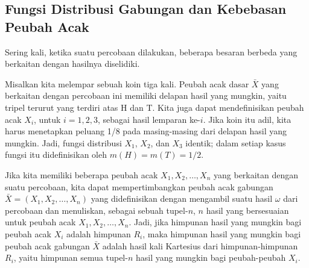 \subsection*{Fungsi Distribusi Gabungan dan Kebebasan Peubah Acak}

Sering kali, ketika suatu percobaan dilakukan, beberapa besaran berbeda yang
berkaitan dengan hasilnya diselidiki.  

\begin{example}\label{exam 4.91}
Misalkan kita melempar sebuah koin tiga kali.  Peubah acak dasar ${\bar X}$ yang berkaitan
dengan percobaan ini memiliki delapan hasil yang mungkin, yaitu tripel terurut yang terdiri
atas H dan T.  Kita juga dapat mendefinisikan peubah acak $X_i$, untuk $i = 1, 2, 3$, sebagai
hasil lemparan ke-$i$.  Jika koin itu adil, kita harus menetapkan peluang
1/8 pada masing-masing dari delapan hasil yang mungkin.  Jadi, fungsi distribusi $X_1$,
$X_2$, dan $X_3$ identik; dalam setiap kasus fungsi itu didefinisikan oleh $m(H) = m(T) = 1/2$.
\end{example}

Jika kita memiliki beberapa peubah acak $X_1, X_2, \ldots, X_n$ yang berkaitan dengan suatu
percobaan, kita dapat mempertimbangkan peubah acak gabungan ${\bar X} = (X_1, X_2,
\ldots, X_n)$ yang didefinisikan dengan mengambil suatu hasil $\omega$ dari percobaan dan menuliskan,
sebagai sebuah tupel-$n$, $n$ hasil yang bersesuaian untuk peubah acak $X_1, X_2, \ldots, X_n$. 
Jadi, jika himpunan hasil yang mungkin bagi peubah acak $X_i$ adalah himpunan $R_i$, maka
himpunan hasil yang mungkin bagi peubah acak gabungan ${\bar X}$ adalah hasil kali Kartesius
dari himpunan-himpunan $R_i$, yaitu himpunan semua tupel-$n$ hasil yang mungkin bagi peubah-peubah $X_i$.

